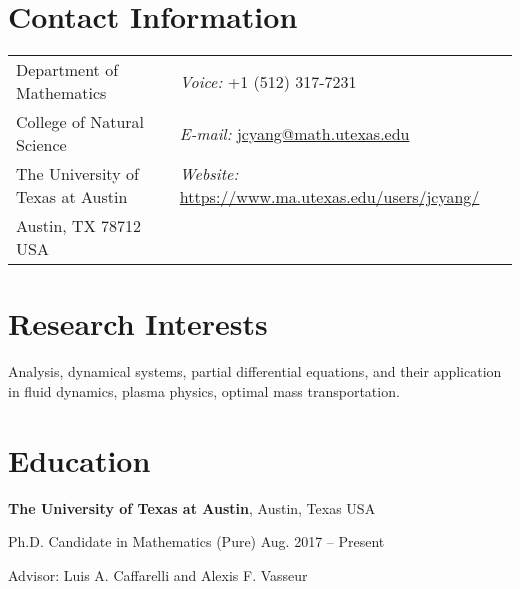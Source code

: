 \documentclass[margin,line]{res}
\newenvironment{list1}{
  \begin{list}{}{%
      \setlength{\itemsep}{0.02in}
      \setlength{\parsep}{0in} 
      \setlength{\parskip}{0in}
      \setlength{\topsep}{0.1in}
      \setlength{\partopsep}{-0.07in} 
      \setlength{\leftmargin}{0.15in}
    }}
{\end{list}}
\begin{document}

\begin{resume}

\section{\sc Contact Information}

\vspace{.04in}
\begin{tabular}{@{}p{2.5in}p{3.25in}}        
Department of Mathematics & {\it Voice:} {\sf +1 (512) 317-7231} \\
College of Natural Science & {\it E-mail:} \href{mailto:jcyang@math.utexas.edu}{\sf jcyang@math.utexas.edu}\\
The University of Texas at Austin & {\it Website:} \href{https://www.ma.utexas.edu/users/jcyang/}{\sf https://www.ma.utexas.edu/users/jcyang/}\\
Austin, TX 78712 USA & 
\end{tabular}

\section{\sc Research Interests}
Analysis, dynamical systems, partial differential equations, and their application in fluid dynamics, plasma physics, optimal mass transportation.

\section{\sc Education}

{\bf The University of Texas at Austin}, Austin, Texas USA

\begin{list1}
\item Ph.D. Candidate in Mathematics (Pure) \hfill Aug. 2017 -- Present
\item Advisor: Luis A. Caffarelli and Alexis F. Vasseur
\end{list1}


\end{resume}
\end{document}
